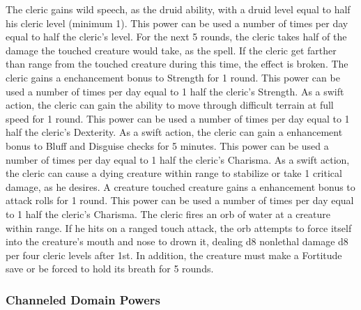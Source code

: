  The cleric gains wild speech, as the druid ability, with a druid level equal to half his cleric level (minimum 1). This power can be used a number of times per day equal to half the cleric's level.
 For the next 5 rounds, the cleric takes half of the damage the touched creature would take, as the  spell. If the cleric get farther than \rngmed range from the touched creature during this time, the effect is broken.
 The cleric gains a  enchancement bonus to Strength for 1 round. \bonusscalingdescription This power can be used a number of times per day equal to 1 \add half the cleric's Strength.
 As a swift action, the cleric can gain the ability to move through difficult terrain at full speed for 1 round. This power can be used a number of times per day equal to 1 \add half the cleric's Dexterity.
 As a swift action, the cleric can gain a  enhancement bonus to Bluff and Disguise checks for 5 minutes. This power can be used a number of times per day equal to 1 \add half the cleric's Charisma.
 As a swift action, the cleric can cause a dying creature within \rngmed range to stabilize or take 1 critical damage, as he desires.
 A creature touched creature gains a  enhancement bonus to attack rolls for 1 round. \bonusscalingdescription This power can be used a number of times per day equal to 1 \add half the cleric's Charisma.
 The cleric fires an orb of water at a creature within \rngclose range. If he hits on a ranged touch attack, the orb attempts to force itself into the creature's mouth and nose to drown it, dealing d8 nonlethal damage \add d8 per four cleric levels after 1st. In addition, the creature must make a Fortitude save or be forced to hold its breath for 5 rounds.

\subsubsection{Channeled Domain Powers}\label{Channeled Domain Powers}


